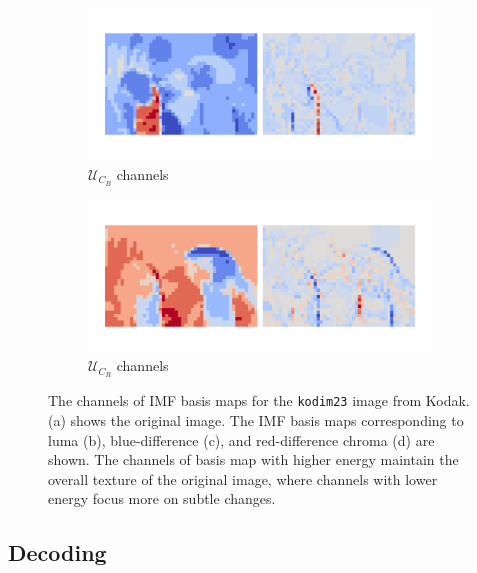 \begin{figure}[t]
\begin{minipage}{0.32\textwidth}
        \centering
        \begin{subfigure}{\textwidth}
            \centering
            \includegraphics[width=.95\textwidth]{figures/kodim23_cb_components.pdf}
            \vspace{-10pt}
            \caption{$\bm{\mathcal{U}}_{C_B}$ channels}
        \end{subfigure}
        \begin{subfigure}{\textwidth}
            \centering
            \includegraphics[width=.95\textwidth]{figures/kodim23_cr_components.pdf}
            \vspace{-10pt}
            \caption{$\bm{\mathcal{U}}_{C_R}$ channels}
        \end{subfigure}
    \end{minipage}
    \caption{The channels of IMF basis maps for the \texttt{kodim23} image from Kodak. (a) shows the original image. The IMF basis maps corresponding to luma (b), blue-difference (c), and red-difference chroma (d) are shown. The channels of basis map with higher energy maintain the overall texture of the original image, where channels with lower energy focus more on subtle changes.}
	\label{fig: imf_components}
\end{figure}


\subsection{Decoding} \label{sec: decoding}

